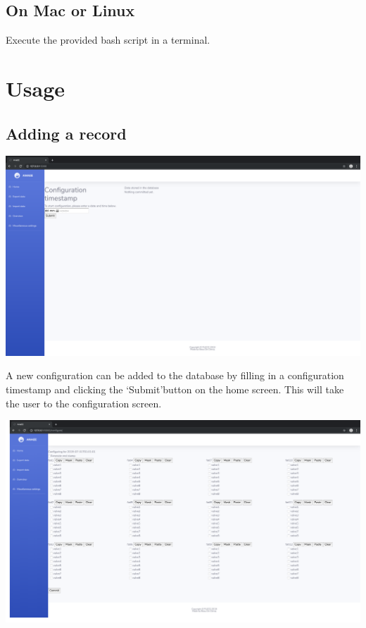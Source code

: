 \documentclass[12pt]{article}
\begin{document}
\subsection{On Mac or Linux}
Execute the provided bash script in a terminal.
\newpage

\section{Usage}
\subsection{Adding a record}
\begin{center}
	\includegraphics[width=\linewidth]{images/Home_screen_no_data.png}
\end{center}
A new configuration can be added to the database by filling in a configuration timestamp and clicking the \lq Submit\rq button on the home screen. This will take the user to the configuration screen.\\
\begin{center}
	\includegraphics[width=\linewidth]{images/Empty_config_screen.png}
\end{center}
\end{document}
